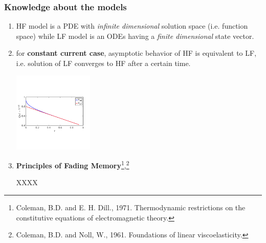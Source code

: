 \documentclass[10pt,xcolor=dvipsnames,compress]{beamer}
\begin{document}
\begin{frame}
\frametitle{Knowledge about the models}
\vfill


\begin{problock}{}
\begin{enumerate}

\item HF model is a PDE with \textit{infinite dimensional} solution space (i.e. function space) while  
LF model is an ODEs having a \textit{finite dimensional} state vector. 


\item for \textbf{constant current case}, asymptotic behavior of HF is equivalent to LF, i.e. solution of LF converges to HF after a certain time.
\begin{center}
    \includegraphics[trim = 0.in 2.4in 0.in 2.8in, clip, width=0.3\textwidth]{figs/Iconst_V_hf_lf.png} 

\end{center}

\item \textbf{Principles of Fading Memory}\footnote{
Coleman, B.D. and E. H. Dill., 1971. Thermodynamic restrictions on the constitutive equations of electromagnetic theory.},\footnote{
Coleman, B.D. and Noll, W., 1961. Foundations of linear viscoelasticity.}

XXXX
 

\end{enumerate}
\end{problock}


\vfill
\end{frame}
\end{document}
